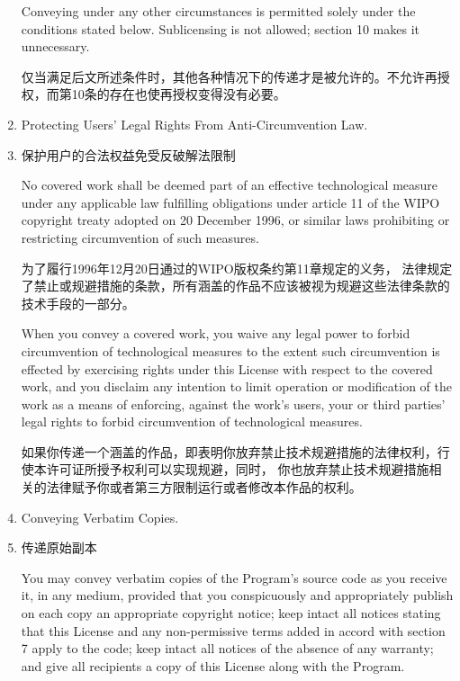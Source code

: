 \documentclass[11pt]{article}
\begin{document}
\begin{enumerate}
        Conveying under any other circumstances is permitted solely under
        the conditions stated below.  Sublicensing is not allowed; section 10
        makes it unnecessary.

        仅当满足后文所述条件时，其他各种情况下的传递才是被允许的。不允许再授权，而第10条的存在也使再授权变得没有必要。

  \item Protecting Users' Legal Rights From Anti-Circumvention Law.
  \item 保护用户的合法权益免受反破解法限制

        No covered work shall be deemed part of an effective technological
        measure under any applicable law fulfilling obligations under article
        11 of the WIPO copyright treaty adopted on 20 December 1996, or
        similar laws prohibiting or restricting circumvention of such
        measures.

        为了履行1996年12月20日通过的WIPO版权条约第11章规定的义务，
        法律规定了禁止或规避措施的条款，所有涵盖的作品不应该被视为规避这些法律条款的技术手段的一部分。

        When you convey a covered work, you waive any legal power to forbid
        circumvention of technological measures to the extent such circumvention
        is effected by exercising rights under this License with respect to
        the covered work, and you disclaim any intention to limit operation or
        modification of the work as a means of enforcing, against the work's
        users, your or third parties' legal rights to forbid circumvention of
        technological measures.

        如果你传递一个涵盖的作品，即表明你放弃禁止技术规避措施的法律权利，行使本许可证所授予权利可以实现规避，同时，
        你也放弃禁止技术规避措施相关的法律赋予你或者第三方限制运行或者修改本作品的权利。

  \item Conveying Verbatim Copies.
  \item 传递原始副本

        You may convey verbatim copies of the Program's source code as you
        receive it, in any medium, provided that you conspicuously and
        appropriately publish on each copy an appropriate copyright notice;
        keep intact all notices stating that this License and any
        non-permissive terms added in accord with section 7 apply to the code;
        keep intact all notices of the absence of any warranty; and give all
        recipients a copy of this License along with the Program.


\end{enumerate}
\end{document}
